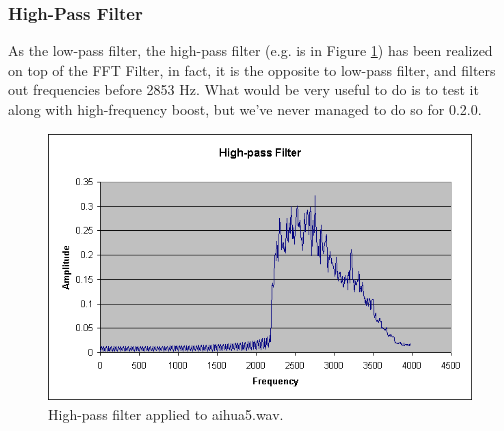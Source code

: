 \subsubsection{High-Pass Filter}

As the low-pass filter, the high-pass filter (e.g. is in Figure \ref{fig:high-pass})
has been realized on top of the FFT Filter,
in fact, it is the opposite to low-pass filter, and filters out
frequencies before 2853 Hz. What would be very useful to do is
to test it along with high-frequency boost, but we've never managed
to do so for 0.2.0.

\begin{figure}
	\centering
	\includegraphics[width=400pt]{../graphics/graphs/high-pass-filter.png}
	\caption{High-pass filter applied to aihua5.wav.}
	\label{fig:high-pass}
\end{figure}
